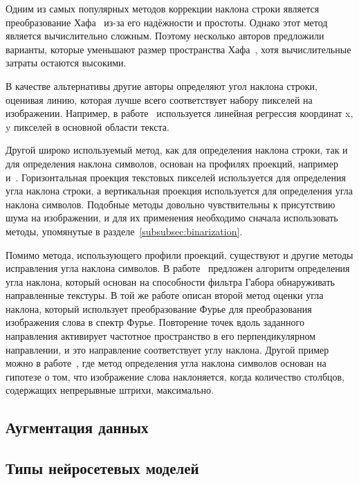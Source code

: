 Одним из самых популярных методов коррекции наклона строки является преобразование Хафа~\cite{duda1972use} из-за его надёжности и простоты.
Однако этот метод является вычислительно сложным.
Поэтому несколько авторов предложили варианты, которые уменьшают размер пространства Хафа~\cite{pal1996improved,boukharouba2017new}, хотя вычислительные затраты остаются высокими.

В качестве альтернативы другие авторы определяют угол наклона строки, оценивая линию, которая лучше всего соответствует набору пикселей на изображении.
Например, в работе~\cite{gupta2014efficient} используется линейная регрессия координат x, y пикселей в основной области текста.

Другой широко используемый метод, как для определения наклона строки, так и для определения наклона символов, основан на профилях проекций, например~\cite{kavallieratou2002skew} и~\cite{pastor2004projection}.
Горизонтальная проекция текстовых пикселей используется для определения угла наклона строки, а вертикальная проекция используется для определения угла наклона символов.
Подобные методы довольно чувствительны к присутствию шума на изображении, и для их применения необходимо сначала использовать методы, упомянутые в разделе~\ref{subsubsec:binarization}.

Помимо метода, использующего профили проекций, существуют и другие методы исправления угла наклона символов.
В работе~\cite{gupta2012novel} предложен алгоритм определения угла наклона, который основан на способности фильтра Габора обнаруживать направленные текстуры.
В той же работе описан второй метод оценки угла наклона, который использует преобразование Фурье для преобразования изображения слова в спектр Фурье.
Повторение точек вдоль заданного направления активирует частотное пространство в его перпендикулярном направлении, и это направление соответствует углу наклона.
Другой пример можно в работе~\cite{vinciarelli2001new}, где метод определения угла наклона символов основан на гипотезе о том,
что изображение слова наклоняется, когда количество столбцов, содержащих непрерывные штрихи, максимально.


\subsection{Аугментация данных}
\label{subsec:augmentation}




\subsection{Типы нейросетевых моделей}
\label{subsec:networks-description}

